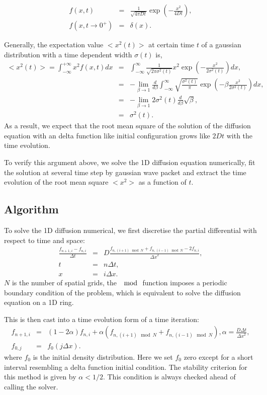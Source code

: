 \documentclass[a4paper,12pt]{article}
\begin{document}
\begin{eqnarray*}
	f(x,t) &=& \frac{1}{\sqrt{4\pi D t}} \exp{(-\frac{x^2}{4Dt})}, \\
	f(x, t \rightarrow 0^+) &=& \delta(x).
\end{eqnarray*}

Generally, the expectation value $<x^2(t)>$ at certain time $t$ of a gaussian distribution with a time dependent width $\sigma(t)$ is,
\begin{eqnarray*}
	<x^2(t)> = \int_{-\infty}^{+\infty} x^2 f(x,t) dx &=&  \int_{-\infty}^{\infty}  \frac{1}{\sqrt{2\pi \sigma^2(t)}} x^2 \exp{(-\frac{x^2}{2\sigma^2(t)})} dx, \\
	& = & -\lim_{\beta\rightarrow 1}\frac{d}{d\beta}\int_{-\infty}^{\infty}  \sqrt{\frac{\sigma^2(t)}{\pi}} \exp{(-\beta \frac{x^2}{2\sigma^2(t)})} dx, \\
	& = & -\lim_{\beta\rightarrow 1} 2\sigma^2(t)\frac{d}{d\beta}\sqrt{\beta}, \\
	& = & \sigma^2(t). 
\end{eqnarray*}
As a result, we expect that the root mean square of the solution of the diffusion equation with an delta function like initial configuration grows like $2Dt$ with the time evolution. 

To verify this argument above, we solve the 1D diffusion equation numerically, fit the solution at several time step by gaussian wave packet and extract the time evolution of the root mean square $<x^2>$ as a function of $t$.

\subsection{Algorithm}
To solve the 1D diffusion numerical, we first discretise the partial differential with respect to time and space:
\begin{eqnarray*}
\frac{f_{n+1,i}-f_{n,i}}{\Delta t}  &=& D\frac{f_{n,(i+1)\mod N}+f_{n,(i-1)\mod N} - 2 f_{n,i}}{{\Delta x}^2},\\
t &=& n \Delta t, \\
x &=& i \Delta x.
\end{eqnarray*}
$N$ is the number of spatial grids, the $\mod$ function imposes a periodic boundary condition of the problem, which is equivalent to solve the diffusion equation on a 1D ring.

This is then cast into a time evolution form of a time iteration:
\begin{eqnarray*}
f_{n+1,i} &=&  (1 - 2 \alpha) f_{n,i} + \alpha (f_{n, (i+1)\mod N}+f_{n, (i-1)\mod N}), \alpha = \frac{D\Delta t}{{\Delta x}^2},\\
f_{0,j} &=& f_0(j\Delta x).
\end{eqnarray*}
where $f_0$ is the initial density distribution. Here we set $f_0$ zero except for a short interval resembling a delta function initial condition. The stability criterion for this method is given by $\alpha < 1/2$. This condition is always checked ahead of calling the solver. 
\end{document}
